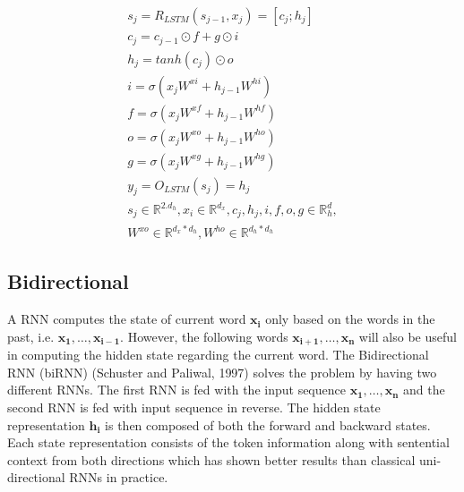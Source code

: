 \documentclass[a4paper, 11pt]{article}
\begin{document}
\begin{align*} \label{lstm_equation}
s_j = R_{LSTM}(s_{j-1},x_j) = [c_j;h_j] \\
c_j = c_{j-1} \odot f + g \odot i \\
h_j = tanh(c_j) \odot o \\
i = \sigma(x_jW^{xi} + h_{j-1} W^{hi}) \\
f = \sigma(x_jW^{xf} + h_{j-1} W^{hf}) \\
o = \sigma(x_jW^{xo} + h_{j-1} W^{ho}) \\
g = \sigma(x_jW^{xg} + h_{j-1} W^{hg}) \\
y_j = O_{LSTM}(s_j) = h_j \\
s_j \in \mathbb{R}^{2.d_h},   x_i \in \mathbb{R}^{d_x},  c_j,h_j,i,f,o,g \in \mathbb{R}^d_h, \\
W^{xo} \in \mathbb{R}^{d_x*d_h},  W^{ho} \in \mathbb{R}^{d_h*d_h}
\end{align*}

\subsection{Bidirectional}
A RNN computes the state of current word $\mathbf{x_{i}}$ only based on the words in the past, i.e. $\mathrm{\mathbf{x_1},\dots,\mathbf{x_{i-1}}}$. However, the following words $\mathrm{\mathbf{x_{i+1}},\dots,\mathbf{x_{n}}}$ will also be useful in computing the hidden state regarding the current word. The Bidirectional RNN (biRNN) (Schuster and Paliwal, 1997) solves the problem by having two different RNNs. The first RNN is fed with the input sequence $\mathrm{\mathbf{x_{1}},\dots,\mathbf{x_{n}}}$ and the second RNN is fed with input sequence in reverse. The hidden state representation $\mathbf{h_{i}}$ is then composed of both the forward and backward states. Each state representation consists of the token information along with sentential context from both directions which has shown better results than classical uni-directional RNNs in practice.
\end{document}
